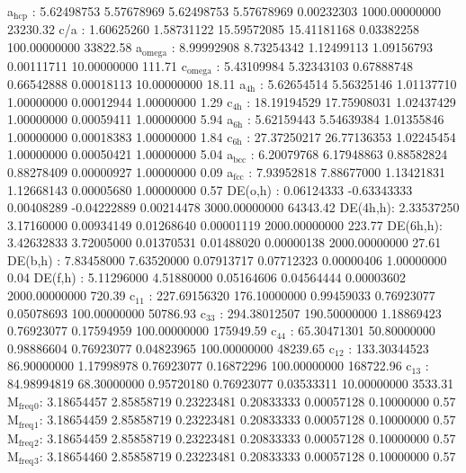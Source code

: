 \documentclass[11pt]{article}
\begin{document}
a\(_{\text{hcp}}\)   :   5.62498753   5.57678969   5.62498753   5.57678969   0.00232303 1000.00000000     23230.32
c/a     :   1.60625260   1.58731122  15.59572085  15.41181168   0.03382258 100.00000000     33822.58
a\(_{\text{omega}}\) :   8.99992908   8.73254342   1.12499113   1.09156793   0.00111711  10.00000000       111.71
c\(_{\text{omega}}\) :   5.43109984   5.32343103   0.67888748   0.66542888   0.00018113  10.00000000        18.11
a\(_{\text{4h}}\)    :   5.62654514   5.56325146   1.01137710   1.00000000   0.00012944   1.00000000         1.29
c\(_{\text{4h}}\)    :  18.19194529  17.75908031   1.02437429   1.00000000   0.00059411   1.00000000         5.94
a\(_{\text{6h}}\)    :   5.62159443   5.54639384   1.01355846   1.00000000   0.00018383   1.00000000         1.84
c\(_{\text{6h}}\)    :  27.37250217  26.77136353   1.02245454   1.00000000   0.00050421   1.00000000         5.04
a\(_{\text{bcc}}\)   :   6.20079768   6.17948863   0.88582824   0.88278409   0.00000927   1.00000000         0.09
a\(_{\text{fcc}}\)   :   7.93952818   7.88677000   1.13421831   1.12668143   0.00005680   1.00000000         0.57
DE(o,h) :   0.06124333  -0.63343333   0.00408289  -0.04222889   0.00214478 3000.00000000     64343.42
DE(4h,h):   2.33537250   3.17160000   0.00934149   0.01268640   0.00001119 2000.00000000       223.77
DE(6h,h):   3.42632833   3.72005000   0.01370531   0.01488020   0.00000138 2000.00000000        27.61
DE(b,h) :   7.83458000   7.63520000   0.07913717   0.07712323   0.00000406   1.00000000         0.04
DE(f,h) :   5.11296000   4.51880000   0.05164606   0.04564444   0.00003602 2000.00000000       720.39
c\(_{\text{11}}\)    : 227.69156320 176.10000000   0.99459033   0.76923077   0.05078693 100.00000000     50786.93
c\(_{\text{33}}\)    : 294.38012507 190.50000000   1.18869423   0.76923077   0.17594959 100.00000000    175949.59
c\(_{\text{44}}\)    :  65.30471301  50.80000000   0.98886604   0.76923077   0.04823965 100.00000000     48239.65
c\(_{\text{12}}\)    : 133.30344523  86.90000000   1.17998978   0.76923077   0.16872296 100.00000000    168722.96
c\(_{\text{13}}\)    :  84.98994819  68.30000000   0.95720180   0.76923077   0.03533311  10.00000000      3533.31
M\(_{\text{freq}}\)\(_{\text{0}}\):   3.18654457   2.85858719   0.23223481   0.20833333   0.00057128   0.10000000         0.57
M\(_{\text{freq}}\)\(_{\text{1}}\):   3.18654459   2.85858719   0.23223481   0.20833333   0.00057128   0.10000000         0.57
M\(_{\text{freq}}\)\(_{\text{2}}\):   3.18654459   2.85858719   0.23223481   0.20833333   0.00057128   0.10000000         0.57
M\(_{\text{freq}}\)\(_{\text{3}}\):   3.18654460   2.85858719   0.23223481   0.20833333   0.00057128   0.10000000         0.57
\end{document}
